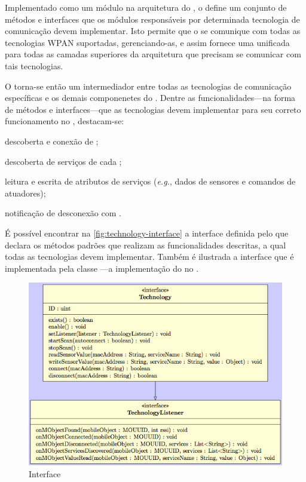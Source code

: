 Implementado como um módulo na arquitetura do \middleware, o \stwopa define um conjunto de métodos e interfaces que os módulos responsáveis por determinada tecnologia de comunicação devem implementar. Isto permite que o \stwopa se comunique com todas as tecnologias WPAN suportadas, gerenciando-as, e assim fornece uma \api unificada para todas as camadas superiores da arquitetura que precisam se comunicar com tais tecnologias.

O \stwopa torna-se então um intermediador entre todas as tecnologias de comunicação específicas e os demais componenetes do \middleware. Dentre as funcionalidades---na forma de métodos e interfaces---que as tecnologias devem implementar para seu correto funcionamento no \middleware, destacam-se:

\begin{alineas}
	\item descoberta e conexão de \smartobjs;
	
	\item descoberta de serviços de cada \smartobjs;

	\item leitura e escrita de atributos de serviços (\textit{e.g.}, dados de sensores e comandos de atuadores);

	\item notificação de desconexão com \smartobjs.
\end{alineas}

É possível encontrar na \autoref{fig:technology-interface} a interface \techinterface definida pelo \stwopa que declara os métodos padrões que realizam as funcionalidades descritas, a qual todas as tecnologias devem implementar. Também é ilustrada a interface \techlistener que é implementada pela classe \stwopaservice---a implementação do \stwopa no \mhub.

\begin{figure}[htb]
	\centering
	\caption{\label{fig:technology-interface}Interface \techinterface}
	\includegraphics[scale=0.6]{img/technology-interface.png}
\end{figure}

